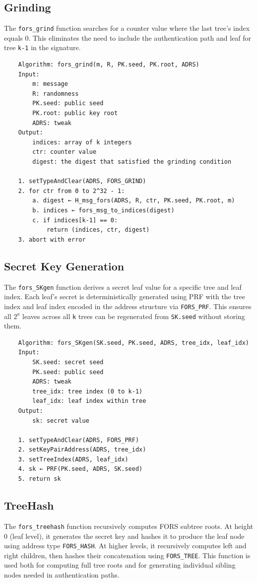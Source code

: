 \subsection{Grinding}
The \texttt{fors\_grind} function searches for a counter value where the last tree's index equals 0. This eliminates the need to include the authentication path and leaf for tree \texttt{k-1} in the signature.
\begin{verbatim}
    Algorithm: fors_grind(m, R, PK.seed, PK.root, ADRS)
    Input:
        m: message
        R: randomness
        PK.seed: public seed
        PK.root: public key root
        ADRS: tweak
    Output:
        indices: array of k integers
        ctr: counter value
        digest: the digest that satisfied the grinding condition

    1. setTypeAndClear(ADRS, FORS_GRIND)
    2. for ctr from 0 to 2^32 - 1:
        a. digest ← H_msg_fors(ADRS, R, ctr, PK.seed, PK.root, m)
        b. indices ← fors_msg_to_indices(digest)
        c. if indices[k-1] == 0:
            return (indices, ctr, digest)
    3. abort with error
\end{verbatim}

\subsection{Secret Key Generation}
The \texttt{fors\_SKgen} function derives a secret leaf value for a specific tree and leaf index. Each leaf's secret is deterministically generated using PRF with the tree index and leaf index encoded in the address structure via \texttt{FORS\_PRF}. This ensures all $2^a$ leaves across all \texttt{k} trees can be regenerated from \texttt{SK.seed} without storing them.
\begin{verbatim}
    Algorithm: fors_SKgen(SK.seed, PK.seed, ADRS, tree_idx, leaf_idx)
    Input:
        SK.seed: secret seed
        PK.seed: public seed
        ADRS: tweak
        tree_idx: tree index (0 to k-1)
        leaf_idx: leaf index within tree
    Output:
        sk: secret value

    1. setTypeAndClear(ADRS, FORS_PRF)
    2. setKeyPairAddress(ADRS, tree_idx)
    3. setTreeIndex(ADRS, leaf_idx)
    4. sk ← PRF(PK.seed, ADRS, SK.seed)
    5. return sk
\end{verbatim}

\subsection{TreeHash}
The \texttt{fors\_treehash} function recursively computes FORS subtree roots. At height 0 (leaf level), it generates the secret key and hashes it to produce the leaf node using address type \texttt{FORS\_HASH}. At higher levels, it recursively computes left and right children, then hashes their concatenation using \texttt{FORS\_TREE}. This function is used both for computing full tree roots and for generating individual sibling nodes needed in authentication paths.

